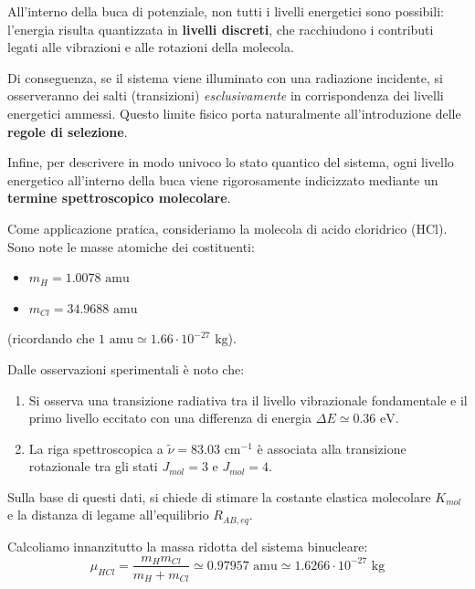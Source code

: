 All'interno della buca di potenziale, non tutti i livelli energetici sono possibili: l'energia risulta quantizzata in \textbf{livelli discreti}, che racchiudono i contributi legati alle vibrazioni e alle rotazioni della molecola.

Di conseguenza, se il sistema viene illuminato con una radiazione incidente, si osserveranno dei salti (transizioni) \textit{esclusivamente} in corrispondenza dei livelli energetici ammessi. Questo limite fisico porta naturalmente all'introduzione delle \textbf{regole di selezione}.

Infine, per descrivere in modo univoco lo stato quantico del sistema, ogni livello energetico all'interno della buca viene rigorosamente indicizzato mediante un \textbf{termine spettroscopico molecolare}.


\begin{exercise}
    Come applicazione pratica, consideriamo la molecola di acido cloridrico (\( \text{HCl} \)). Sono note le masse atomiche dei costituenti:
    \begin{itemize}
        \item \( m_H = 1.0078 \text{ amu} \)
        \item \( m_{Cl} = 34.9688 \text{ amu} \)
    \end{itemize}
    (ricordando che \( 1 \text{ amu} \simeq 1.66 \cdot 10^{-27} \text{ kg} \)).

    Dalle osservazioni sperimentali è noto che:
    \begin{enumerate}
        \item Si osserva una transizione radiativa tra il livello vibrazionale fondamentale e il primo livello eccitato con una differenza di energia \( \Delta E \simeq 0.36 \text{ eV} \).
        \item La riga spettroscopica a \( \tilde{\nu} = 83.03 \text{ cm}^{-1} \) è associata alla transizione rotazionale tra gli stati \( J_{mol} = 3 \) e \( J_{mol} = 4 \).
    \end{enumerate}

    Sulla base di questi dati, si chiede di stimare la costante elastica molecolare \( K_{mol} \) e la distanza di legame all'equilibrio \( R_{AB,eq} \).

\begin{solution}
    Calcoliamo innanzitutto la massa ridotta del sistema binucleare:
    \begin{equation}
        \mu_{HCl} = \frac{m_H m_{Cl}}{m_H + m_{Cl}} \simeq 0.97957 \text{ amu} \simeq 1.6266 \cdot 10^{-27} \text{ kg}
    \end{equation}


\end{solution}
\end{exercise}
